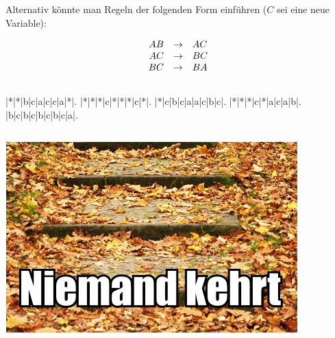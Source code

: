 \documentclass{article}
\begin{document}
Alternativ könnte man Regeln der folgenden Form einführen ($C$ sei eine neue
Variable):

\begin{equation*}
   \begin{array}{rcl}
      AB & \rightarrow & AC \\
      AC & \rightarrow & BC \\
      BC & \rightarrow & BA
   \end{array}
\end{equation*}

\subsection{} 

\vspace{\baselineskip}
\hspace{1.8cm}\begin{minipage}{.4\textwidth}
   \def\PuzzleSolutionContent#1{\makebox(1,1){\itshape{#1}}}
   \renewcommand{\PuzzleLineThickness}{1pt}
   \PuzzleSolution
   \begin{Puzzle}{5}{9}
      |*|*|b|c|a|c|c|a|*|.
      |*|*|*|c|*|*|*|c|*|.
      |*|c|b|c|a|a|c|b|c|.
      |*|*|*|c|*|a|c|a|b|.
      |b|c|b|c|b|c|b|c|a|.
   \end{Puzzle}
\end{minipage}
\vspace{-2cm}

\subsection{} 

\begin{center}
   \includegraphics{niemand_kehrt.jpeg}
\end{center}
\end{document}
